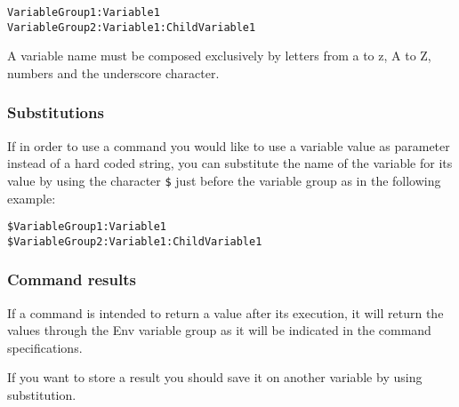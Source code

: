 \begin{verbatim}
VariableGroup1:Variable1
VariableGroup2:Variable1:ChildVariable1
\end{verbatim}

A variable name must be composed exclusively by letters from a to z, A to Z, numbers and the underscore character.

\subsubsection{Substitutions}
If in order to use a command you would like to use a variable value as parameter instead of a hard coded string, you can substitute the name of the variable for its value by using the character \texttt{\$} just before the variable group as in the following example:

\begin{verbatim}
$VariableGroup1:Variable1
$VariableGroup2:Variable1:ChildVariable1
\end{verbatim}

\subsubsection{Command results}
If a command is intended to return a value after its execution, it will return the values through the Env variable group as it will be indicated in the command specifications.

If you want to store a result you should save it on another variable by using substitution.



















